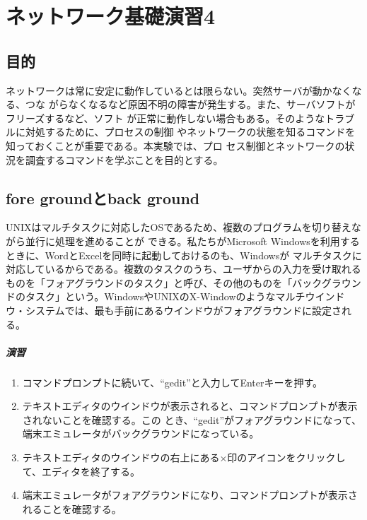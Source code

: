 
\chapter{ネットワーク基礎演習4}

\section{目的}

ネットワークは常に安定に動作しているとは限らない。突然サーバが動かなくなる、つな
がらなくなるなど原因不明の障害が発生する。また、サーバソフトがフリーズするなど、ソフト
が正常に動作しない場合もある。そのようなトラブルに対処するために、プロセスの制御
やネットワークの状態を知るコマンドを知っておくことが重要である。本実験では、プロ
セス制御とネットワークの状況を調査するコマンドを学ぶことを目的とする。

\section{fore groundとback ground}

UNIXはマルチタスクに対応したOSであるため、複数のプログラムを切り替えながら並行に処理を進めることが
できる。私たちがMicrosoft Windowsを利用するときに、WordとExcelを同時に起動しておけるのも、Windowsが
マルチタスクに対応しているからである。複数のタスクのうち、ユーザからの入力を受け取れるものを「フォアグラウンドのタスク」と呼び、その他のものを「バックグラウンドのタスク」という。WindowsやUNIXのX-Windowのようなマルチウインドウ・システムでは、最も手前にあるウインドウがフォアグラウンドに設定される。

\paragraph{演習}
\begin{enumerate}
\item コマンドプロンプトに続いて、``gedit''と入力してEnterキーを押す。
\item テキストエディタのウインドウが表示されると、コマンドプロンプトが表示されないことを確認する。この
とき、``gedit''がフォアグラウンドになって、端末エミュレータがバックグラウンドになっている。
\item テキストエディタのウインドウの右上にある×印のアイコンをクリックして、エディタを終了する。
\item 端末エミュレータがフォアグラウンドになり、コマンドプロンプトが表示されることを確認する。
\end{enumerate}

